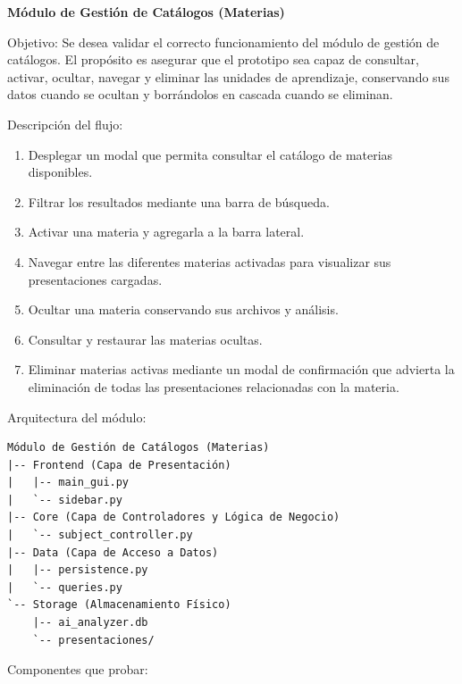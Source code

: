 \documentclass[11pt]{article}
\begin{document}
\textbf{Módulo de Gestión de Catálogos (Materias)}

Objetivo: Se desea validar el correcto funcionamiento del módulo de gestión de catálogos. El propósito es asegurar que el prototipo sea capaz de consultar, activar, ocultar, navegar y eliminar las unidades de aprendizaje, conservando sus datos cuando se ocultan y borrándolos en cascada cuando se eliminan.

Descripción del flujo:
\begin{enumerate}
    \item Desplegar un modal que permita consultar el catálogo de materias disponibles.
    \item Filtrar los resultados mediante una barra de búsqueda.
    \item Activar una materia y agregarla a la barra lateral.
    \item Navegar entre las diferentes materias activadas para visualizar sus presentaciones cargadas.
    \item Ocultar una materia conservando sus archivos y análisis.
    \item Consultar y restaurar las materias ocultas.
    \item Eliminar materias activas mediante un modal de confirmación que advierta la eliminación de todas las presentaciones relacionadas con la materia.
\end{enumerate}


Arquitectura del módulo:
\begin{verbatim}
Módulo de Gestión de Catálogos (Materias)
|-- Frontend (Capa de Presentación)
|   |-- main_gui.py
|   `-- sidebar.py
|-- Core (Capa de Controladores y Lógica de Negocio)
|   `-- subject_controller.py
|-- Data (Capa de Acceso a Datos)
|   |-- persistence.py
|   `-- queries.py
`-- Storage (Almacenamiento Físico)
    |-- ai_analyzer.db
    `-- presentaciones/
\end{verbatim}

Componentes que probar:
\end{document}
